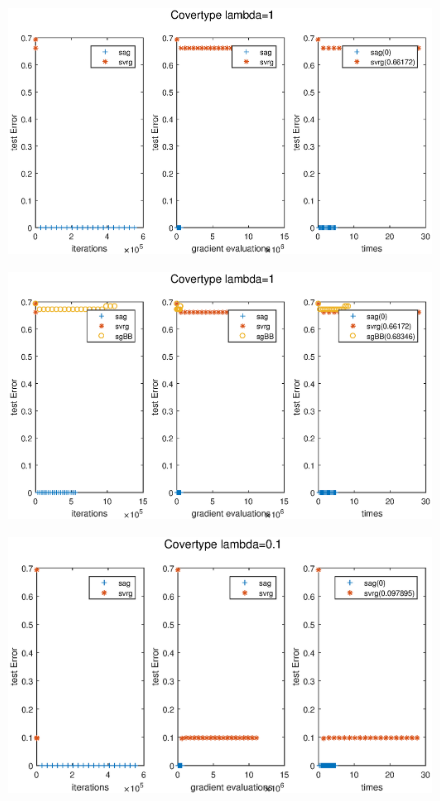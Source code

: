 \documentclass[UTF8]{ctexart}
\begin{document}
\begin{figure}[htbp]
\centering\includegraphics[width=5in]{2-1-a.eps}
\label{fig:2-1-a}
\end{figure}

\begin{figure}[htbp]
\centering\includegraphics[width=5in]{2-1-b.eps}
\label{fig:2-1-b}
\end{figure}

\begin{figure}[htbp]
\centering\includegraphics[width=5in]{2-01-a.eps}
\label{fig:2-0.1-a}
\end{figure}
\end{document}
